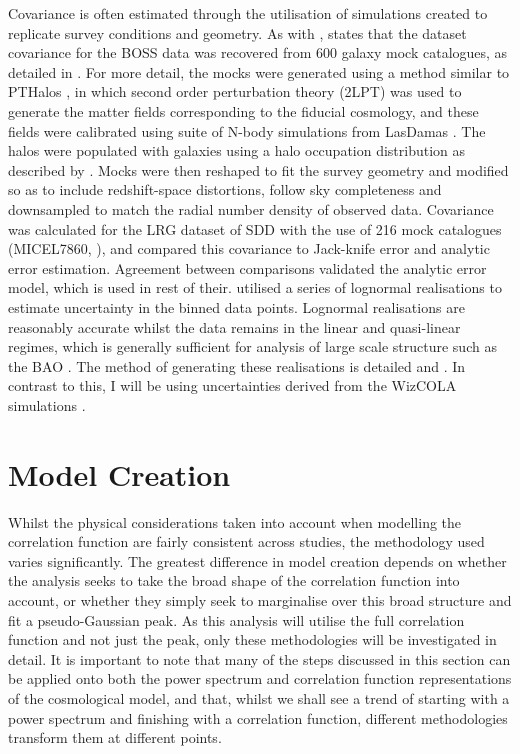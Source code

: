 \documentclass[titlesmallcaps, examinerscopy, copyrightpage]{uqthesis}
\begin{document}
Covariance is often estimated through the utilisation of simulations created to replicate survey conditions and geometry. As with \citet{SanchezScoccola2012}, \citet{AndersonAubourg2012} states that the dataset covariance for the BOSS data was recovered from 600 galaxy mock catalogues, as detailed in \citet{ManeraScoccimarro2013}. For more detail, the mocks were generated using a method similar to PTHalos \citep{ScoccimarroSheth2002}, in which second order perturbation theory (2LPT) was used to generate the matter fields corresponding to the fiducial cosmology, and these fields were calibrated using suite of N-body simulations from LasDamas \citep{McBride2011}. The halos were populated with galaxies using a halo occupation distribution as described by \citet{ZhengCoilZehavi2007}. Mocks were then reshaped to fit the survey geometry and modified so as to include redshift-space distortions, follow sky completeness and downsampled to match the radial number density of observed data. Covariance was calculated for the LRG dataset of SDD with the use of 216 mock catalogues (MICEL7860, \citet[see][for details]{FosalbaGaztanaga2008, CrocceFosalbaCastander2010}), and \citet{Gaztanaga2009} compared this covariance to Jack-knife error and analytic error estimation. Agreement between comparisons validated the analytic error model, which is used in rest of their. \citet{BlakeDavis2011} utilised a series of lognormal realisations to estimate uncertainty in the binned data points. Lognormal realisations are reasonably accurate whilst the data remains in the linear and quasi-linear regimes, which is generally sufficient for analysis of large scale structure such as the BAO \citep{ColesJones1991}. The method of generating these realisations is detailed \citet{BlakeGlazebrook2003} and \citet{GlazebrookBlake2005}. In contrast to this, I will be using uncertainties derived from the WizCOLA simulations \citep{KodaBlake2015}. 






\section{Model Creation}

Whilst the physical considerations taken into account when modelling the correlation function are fairly consistent across studies, the methodology used varies significantly. The greatest difference in model creation depends on whether the analysis seeks to take the broad shape of the correlation function into account, or whether they simply seek to marginalise over this broad structure and fit a pseudo-Gaussian peak. As this analysis will utilise the full correlation function and not just the peak, only these methodologies will be investigated in detail. It is important to note that many of the steps discussed in this section can be applied onto both the power spectrum and correlation function representations of the cosmological model, and that, whilst we shall see a trend of starting with a power spectrum and finishing with a correlation function, different methodologies transform them at different points. 
\end{document}
